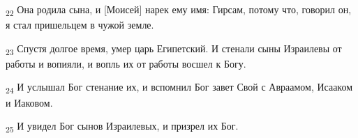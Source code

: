 \begin{tcolorbox}
\textsubscript{22} Она родила сына, и [Моисей] нарек ему имя: Гирсам, потому что, говорил он, я стал пришельцем в чужой земле.
\end{tcolorbox}
\begin{tcolorbox}
\textsubscript{23} Спустя долгое время, умер царь Египетский. И стенали сыны Израилевы от работы и вопияли, и вопль их от работы восшел к Богу.
\end{tcolorbox}
\begin{tcolorbox}
\textsubscript{24} И услышал Бог стенание их, и вспомнил Бог завет Свой с Авраамом, Исааком и Иаковом.
\end{tcolorbox}
\begin{tcolorbox}
\textsubscript{25} И увидел Бог сынов Израилевых, и призрел их Бог.
\end{tcolorbox}
